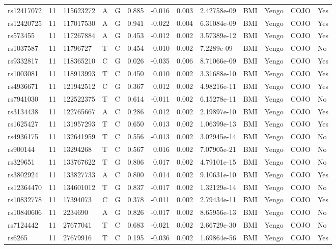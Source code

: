 \documentclass[11pt,twoside]{bristolthesis}
\begin{document}
\begin{longtable}[t]{lrlllrrrlllll}
rs12417072 & 11 & 115623272 & A & G & 0.885 & -0.016 & 0.003 & 2.42758e-09 & BMI & Yengo & COJO & Yes\\
rs12420725 & 11 & 117017530 & A & G & 0.941 & -0.022 & 0.004 & 6.31084e-09 & BMI & Yengo & COJO & Yes\\
rs573455 & 11 & 117267884 & A & G & 0.453 & -0.012 & 0.002 & 3.57389e-12 & BMI & Yengo & COJO & Yes\\
rs1037587 & 11 & 11796727 & T & C & 0.454 & 0.010 & 0.002 & 7.2289e-09 & BMI & Yengo & COJO & No\\
\addlinespace
rs9332817 & 11 & 118365210 & C & G & 0.026 & -0.035 & 0.006 & 8.71066e-09 & BMI & Yengo & COJO & Yes\\
rs1003081 & 11 & 118913993 & T & C & 0.450 & 0.010 & 0.002 & 3.31688e-10 & BMI & Yengo & COJO & Yes\\
rs4936671 & 11 & 121942512 & C & G & 0.367 & 0.012 & 0.002 & 4.98216e-11 & BMI & Yengo & COJO & Yes\\
rs7941030 & 11 & 122522375 & T & C & 0.614 & -0.011 & 0.002 & 6.15278e-11 & BMI & Yengo & COJO & No\\
rs3134438 & 11 & 122765667 & A & C & 0.286 & 0.012 & 0.002 & 2.19897e-10 & BMI & Yengo & COJO & Yes\\
\addlinespace
rs1625427 & 11 & 131957293 & T & C & 0.650 & 0.013 & 0.002 & 1.06399e-13 & BMI & Yengo & COJO & Yes\\
rs4936175 & 11 & 132641959 & T & C & 0.556 & -0.013 & 0.002 & 3.02945e-14 & BMI & Yengo & COJO & No\\
rs900144 & 11 & 13294268 & T & C & 0.567 & 0.016 & 0.002 & 7.07905e-21 & BMI & Yengo & COJO & No\\
rs329651 & 11 & 133767622 & T & G & 0.806 & 0.017 & 0.002 & 4.79101e-15 & BMI & Yengo & COJO & No\\
rs3802924 & 11 & 133827733 & A & C & 0.800 & 0.014 & 0.002 & 9.10631e-10 & BMI & Yengo & COJO & Yes\\
\addlinespace
rs12364470 & 11 & 134601012 & T & G & 0.837 & -0.017 & 0.002 & 1.32129e-14 & BMI & Yengo & COJO & No\\
rs10832778 & 11 & 17394073 & C & G & 0.378 & -0.011 & 0.002 & 2.79434e-11 & BMI & Yengo & COJO & Yes\\
rs10840606 & 11 & 2234690 & A & G & 0.826 & -0.017 & 0.002 & 8.65956e-13 & BMI & Yengo & COJO & No\\
rs7124442 & 11 & 27677041 & T & C & 0.683 & -0.021 & 0.002 & 2.66729e-30 & BMI & Yengo & COJO & No\\
rs6265 & 11 & 27679916 & T & C & 0.195 & -0.036 & 0.002 & 1.69864e-56 & BMI & Yengo & COJO & Yes\\

\end{longtable}
\end{document}
